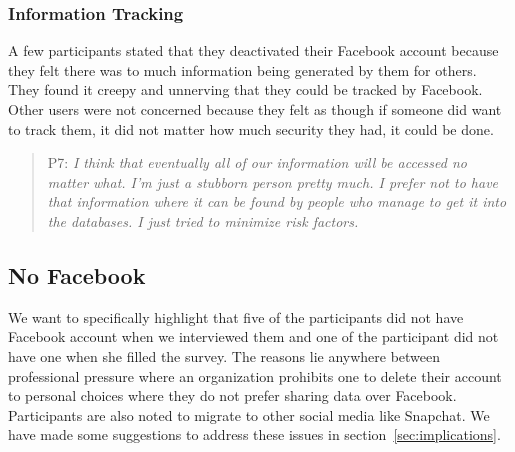 \subsubsection{Information Tracking}
A few participants stated that they deactivated their Facebook account because they felt there was to much information being generated by them for others. They found it creepy and unnerving that they could be tracked by Facebook. Other users were not concerned because they felt as though if someone did want to track them, it did not matter how much security they had, it could be done. 
\begin{quote}
P7: \textit{I think that eventually all of our information will be accessed no matter what. I'm just a stubborn person pretty much. I prefer not to have that information where it can be found by people who manage to get it into the databases.  I just tried to minimize risk factors.}
\end{quote}

\subsection{No Facebook}
We want to specifically highlight that five of the participants did not have Facebook account when we interviewed them and one of the participant did not have one when she filled the survey. The reasons lie anywhere between professional pressure where an organization prohibits one to delete their account to personal choices where they do not prefer sharing data over Facebook. Participants are also noted to migrate to other social media like Snapchat. We have made some suggestions to address these issues in section~\ref{sec:implications}.
